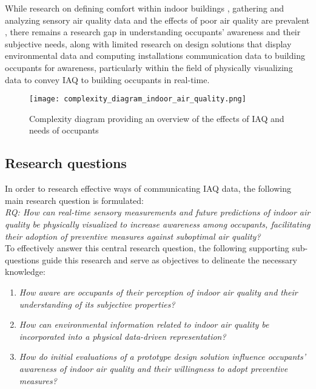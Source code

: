 While research on defining comfort within indoor buildings \cite{alavi_comfort_2017}, gathering and analyzing sensory air quality data \cite{corlan_importance_2021} and the effects of poor air quality are prevalent \cite{klepeis_national_2001}, there remains a research gap in understanding occupants' awareness and their subjective needs, along with limited research on design solutions that display environmental data and computing installations communication data to building occupants for awareness, particularly within the field of physically visualizing data to convey IAQ to building occupants in real-time.

\begin{figure}[h]
    \centering
    \texttt{[image: complexity\_diagram\_indoor\_air\_quality.png]}
    \caption{Complexity diagram providing an overview of the effects of IAQ and needs of occupants \cite{schweizer_indoor_2007, wang_how_2021, kim_analyzing_2019, alavi_comfort_2017, corlan_importance_2021, klepeis_national_2001}}
    \label{fig:complexity}
\end{figure}


\subsection{Research questions}

In order to research effective ways of communicating  IAQ data, the following main research question is formulated: \\

\emph{RQ: How can real-time sensory measurements and future predictions of indoor air quality be physically visualized to increase awareness among occupants, facilitating their adoption of preventive measures against suboptimal air quality?}\label{rq:1} \\

To effectively answer this central research question, the following supporting sub-questions guide this research and serve as objectives to delineate the necessary knowledge: \\

\begin{enumerate}
    \renewcommand{\labelenumi}{SQ\arabic{enumi}:}
    \item \emph{How aware are occupants of their perception of indoor air quality and their understanding of its subjective properties?}\label{subq:1}
    \item \emph{How can environmental information related to indoor air quality be incorporated into a physical data-driven representation?}\label{subq:2}
    \item \emph{How do initial evaluations of a prototype design solution influence occupants’ awareness of indoor air quality and their willingness to adopt preventive measures?}\label{subq:3}\\
\end{enumerate}